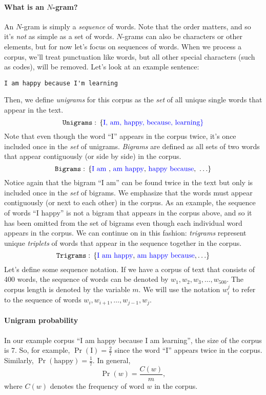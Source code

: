 \documentclass[12pt]{article}
\begin{document}
\paragraph{What is an $N$-gram?} An $N$-gram is simply a \emph{sequence} of words. Note that the order matters, and so it's \emph{not} as simple as a set of words. $N$-grams can also be characters or other elements, but for now let's focus on sequences of words. When we process a corpus, we'll treat punctuation like words, but all other special characters (such as codes), will be removed.
Let's look at an example sentence:
\begin{verbatim}
I am happy because I'm learning
\end{verbatim}
Then, we define \emph{unigrams} for this corpus as the \emph{set} of all unique single words that appear in the text.
\[
  \texttt{Unigrams}: \, \{\color{blue} \textrm{I, am, happy, because, learning} \}
\]
Note that even though the word ``I'' appears in the corpus twice, it's once included once in the \emph{set} of unigrams. \emph{Bigrams} are defined as all sets of two words that appear contiguously (or side by side) in the corpus.
\[
  \texttt{Bigrams}: \, \{\color{blue} \textrm{I am {\color{black},} am happy{\color{black},} happy because{\color{black},} } \color{black} \ldots \}
\]
Notice again that the bigram ``I am'' can be found twice in the text but only is included once in the \emph{set} of bigrams. We emphasize that the words must appear contiguously (or next to each other) in the corpus. As an example, the sequence of words ``I happy'' is not a bigram that appears in the corpus above, and so it has been omitted from the set of bigrams even though each individual word appears in the corpus. We can continue on in this fashion: \emph{trigrams} represent unique \emph{triplets} of words that appear in the sequence together in the corpus.
\[
  \texttt{Trigrams}: \, \{\color{blue} \textrm{I am happy}{\color{black},} \textrm{ am happy because}{\color{black},} \color{black} \ldots \}
\]
Let's define some sequence notation. If we have a corpus of text that consists of 400 words, the sequence of words can be denoted by $w_1, w_2, w_3, \ldots, w_{500}$. The corpus length is denoted by the variable $m$. We will use the notation $w_i^j$ to refer to the sequence of words $w_i, w_{i+1}, \ldots, w_{j-1}, w_j$.

\paragraph{Unigram probability} In our example corpus ``I am happy because I am learning'', the size of the corpus is 7. So, for example, $\Pr(\textrm{I}) = \frac{2}{7}$ since the word ``I'' appears twice in the corpus. Similarly, $\Pr(\textrm{happy}) = \frac{1}{7}$. In general,
\[
  \Pr(w) = \frac{C(w)}{m},
\]
where $C(w)$ denotes the frequency of word $w$ in the corpus.
\end{document}
